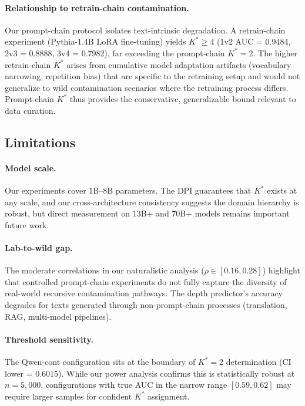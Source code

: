 \documentclass[11pt]{article}
\begin{document}
\paragraph{Relationship to retrain-chain contamination.}
Our prompt-chain protocol isolates text-intrinsic degradation. A retrain-chain experiment (Pythia-1.4B LoRA fine-tuning) yields $K^* \ge 4$ (1v2 AUC = 0.9484, 2v3 = 0.8888, 3v4 = 0.7982), far exceeding the prompt-chain $K^*{=}2$. The higher retrain-chain $K^*$ arises from cumulative model adaptation artifacts (vocabulary narrowing, repetition bias) that are specific to the retraining setup and would not generalize to wild contamination scenarios where the retraining process differs. Prompt-chain $K^*$ thus provides the conservative, generalizable bound relevant to data curation.

\subsection{Limitations}
\label{sec:limitations}

\paragraph{Model scale.} Our experiments cover 1B--8B parameters. The DPI guarantees that $K^*$ exists at any scale, and our cross-architecture consistency suggests the domain hierarchy is robust, but direct measurement on 13B+ and 70B+ models remains important future work.

\paragraph{Lab-to-wild gap.} The moderate correlations in our naturalistic analysis ($\rho \in [0.16, 0.28]$) highlight that controlled prompt-chain experiments do not fully capture the diversity of real-world recursive contamination pathways. The depth predictor's accuracy degrades for texts generated through non-prompt-chain processes (translation, RAG, multi-model pipelines).

\paragraph{Threshold sensitivity.} The Qwen-cont configuration sits at the boundary of $K^*{=}2$ determination (CI lower = 0.6015). While our power analysis confirms this is statistically robust at $n{=}5{,}000$, configurations with true AUC in the narrow range $[0.59, 0.62]$ may require larger samples for confident $K^*$ assignment.
\end{document}
